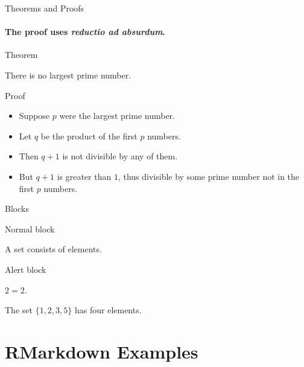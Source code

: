 \documentclass[12pt,ignorenonframetext,compress]{beamer}
\providecommand{\tightlist}{%
  \setlength{\itemsep}{0pt}\setlength{\parskip}{0pt}}
\begin{document}
\begin{frame}{Theorems and Proofs}
\protect\hypertarget{theorems-and-proofs}{}

\framesubtitle{The proof uses \textit{reductio ad absurdum}.}

\begin{block}{Theorem}

There is no largest prime number.

\end{block}

\begin{block}{Proof}

\begin{itemize}[<+->]
\tightlist
\item
  Suppose \(p\) were the largest prime number.
\item
  Let \(q\) be the product of the first \(p\) numbers.
\item
  Then \(q+1\) is not divisible by any of them.
\item
  But \(q + 1\) is greater than \(1\), thus divisible by some prime
  number not in the first \(p\) numbers. \qedhere
\end{itemize}

\end{block}

\end{frame}

\begin{frame}{Blocks}
\protect\hypertarget{blocks-1}{}

\begin{block}{Normal block}

A \alert{set} consists of elements.

\end{block}

\begin{block}{\alert{Alert block}}

\(2=2\).

\end{block}

\begin{block}{}

The set \(\{1,2,3,5\}\) has four elements.

\end{block}

\end{frame}

\hypertarget{rmarkdown-examples}{%
\section{RMarkdown Examples}\label{rmarkdown-examples}}
\end{document}
